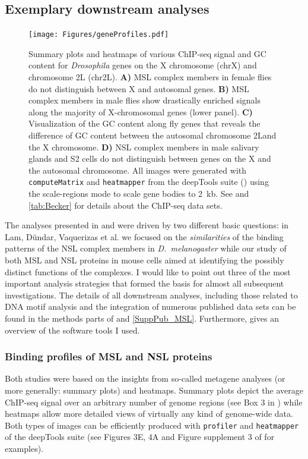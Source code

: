 \subsection{Exemplary downstream analyses}
\begin{figure}[tb]
\centering
\texttt{[image: Figures/geneProfiles.pdf]}
\begin{footnotesize}
\caption[ChIP-seq signals of MSL and NSL complex members in \textit{Drosophila}.]{\textsf{Summary plots and heatmaps of various ChIP-seq signal and GC content for \textit{Drosophila} genes on the X chromosome (chrX) and chromosome 2L (chr2L).
\textbf{A)} MSL complex members in female flies do not distinguish between X and autosomal genes.
\textbf{B)} MSL complex members in male flies show drastically enriched signals along the majority of X-chromosomal genes (lower panel).
\textbf{C)} Visualization of the GC content along fly genes that reveals the difference of GC content between the autosomal chromosome 2Land the X chromosome.
\textbf{D)} NSL complex members in male salivary glands and S2 cells do not distinguish between genes on the X and the autosomal chromosome. All images were generated with \texttt{computeMatrix} and \texttt{heatmapper} from the deepTools suite () using the scale-regions mode to scale gene bodies to 2~kb. See  and \ref{tab:Becker} for details about the ChIP-seq data sets.
}}
\label{fig:profiles}
\end{footnotesize}
\end{figure}
%
The analyses presented in  and  were driven by two different basic questions: in Lam, Dündar, Vaquerizas et al. \citep{Lam2012} we focused on the \textit{similarities} of the binding patterns of the NSL complex members in \textit{D.~melano\-gaster} while our study of both MSL and NSL proteins in mouse cells \citep{Chelmicki2014} aimed at identifying the possibly distinct functions of the complexes. I would like to point out three of the most important analysis strategies that formed the basis for almost all subsequent investigations. The details of all downstream analyses, including those related to DNA motif analysis and the integration of numerous published data sets can be found in the methods parts of  and \ref{SuppPub_MSL}. Furthermore,  gives an overview of the software tools I used.
%
\subsubsection{Binding profiles of MSL and NSL proteins}
Both studies were based on the insights from so-called metagene analyses (or more generally: summary plots) and heatmaps. Summary plots depict the average ChIP-seq signal over an arbitrary number of genome regions (see Box 3 in \citep{Ferrari2014}) while heatmaps allow more detailed views of virtually any kind of genome-wide data. Both types of images can be efficiently produced with \texttt{profiler} and \texttt{heatmapper} of the deepTools suite \citep{Ramirez2014} (see Figures 3E, 4A and Figure supplement 3 of  for examples).

